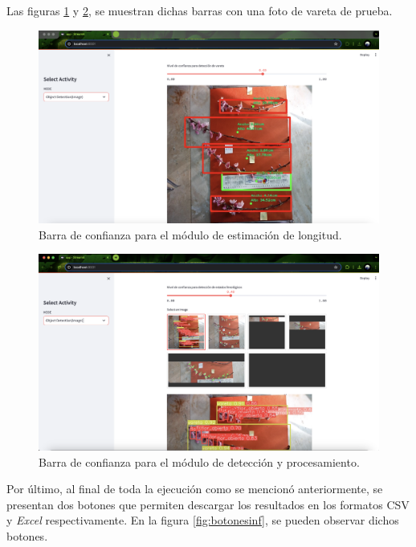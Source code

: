 Las figuras \ref{fig:barra1} y \ref{fig:barra2}, se muestran dichas barras con una foto de vareta de prueba.

\begin{figure}[h]
	\centering
	\includegraphics[scale=0.13]{./Figures/barra1.png}
	\caption{Barra de confianza para el módulo de estimación de longitud.}
	\label{fig:barra1}
\end{figure}

\newpage
\begin{figure}[ht]
	\centering
	\includegraphics[scale=0.13]{./Figures/barra2.png}
	\caption{Barra de confianza para el módulo de detección y procesamiento.}
	\label{fig:barra2}
\end{figure}

Por último, al final de toda la ejecución como se mencionó anteriormente, se presentan dos botones que permiten descargar los resultados en los formatos CSV y \textit{Excel} respectivamente. En la figura \ref{fig:botonesinf}, se pueden observar dichos botones.

